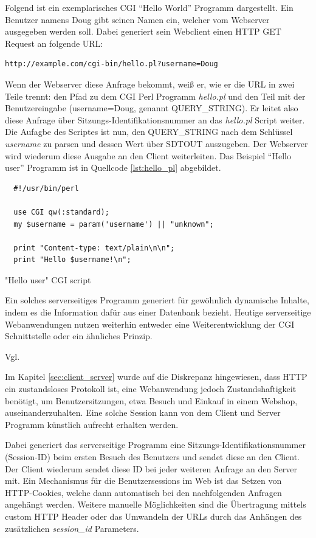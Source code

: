 Folgend ist ein exemplarisches CGI \enquote{Hello World} Programm dargestellt. Ein Benutzer namens Doug gibt seinen Namen ein, welcher vom Webserver ausgegeben werden soll. Dabei generiert sein Webclient einen HTTP GET Request an folgende URL:

\begin{verbatim}
http://example.com/cgi-bin/hello.pl?username=Doug
\end{verbatim}

Wenn der Webserver diese Anfrage bekommt, weiß er, wie er die URL in zwei Teile trennt: den Pfad zu dem CGI Perl Programm \emph{hello.pl} und den Teil mit der Benutzereingabe (username=Doug, genannt QUERY\_STRING). Er leitet also diese Anfrage über Sitzungs-Identifikationsnummer an das \emph{hello.pl} Script weiter. Die Aufagbe des Scriptes ist nun, den QUERY\_STRING nach dem Schlüssel \emph{username} zu parsen und dessen Wert über SDTOUT auszugeben. Der Webserver wird wiederum diese Ausgabe an den Client weiterleiten. Das Beispiel \enquote{Hello user} Programm ist in Quellcode \ref{lst:hello_pl} abgebildet.

\begin{listing}[H]
\begin{verbatim}
  #!/usr/bin/perl

  use CGI qw(:standard);
  my $username = param('username') || "unknown";

  print "Content-type: text/plain\n\n";
  print "Hello $username!\n";
\end{verbatim}
\caption{"Hello user" CGI script}
\label{lst:hello_pl}
\end{listing}

Ein solches serverseitiges Programm generiert für gewöhnlich dynamische Inhalte, indem es die Information dafür aus einer Datenbank bezieht. Heutige serverseitige Webanwendungen nutzen weiterhin entweder eine Weiterentwicklung der CGI Schnittstelle oder ein ähnliches Prinzip.

Vgl. \cite[Kap. 1.1]{Bekman:2003}

Im Kapitel \ref{sec:client_server} wurde auf die Diskrepanz hingewiesen, dass HTTP ein zustandsloses Protokoll ist, eine Webanwendung jedoch Zustandshaftigkeit benötigt, um Benutzersitzungen, etwa Besuch und Einkauf in einem Webshop, auseinanderzuhalten. Eine solche Session kann von dem Client und Server Programm
künstlich aufrecht erhalten werden.

Dabei generiert das serverseitige Programm eine Sitzungs-Identifikationsnummer (Session-ID) beim ersten Besuch des Benutzers und sendet diese an den Client. Der Client wiederum sendet diese  ID bei jeder weiteren Anfrage an den Server mit. Ein Mechanismus für die Benutzersessions im Web ist das Setzen von HTTP-Cookies, welche dann automatisch bei den nachfolgenden Anfragen angehängt werden. Weitere manuelle Möglichkeiten sind die Übertragung mittels custom HTTP Header oder das Umwandeln der URLs durch das Anhängen des zusätzlichen \emph{session\_id} Parameters.

